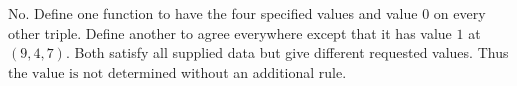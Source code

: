 No. Define one function to have the four specified values and value $0$ on every other triple. Define another to agree everywhere except that it has value $1$ at $(9,4,7)$. Both satisfy all supplied data but give different requested values. Thus $\boxed{\text{the value is not determined}}$ without an additional rule.
